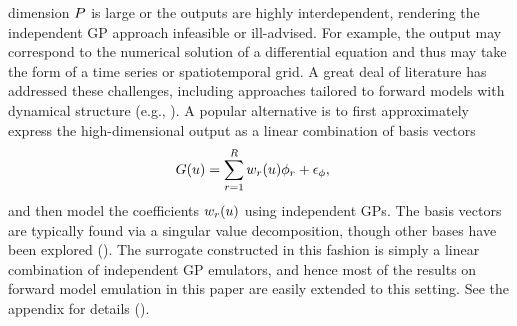 \documentclass[12pt]{article}
\begin{document}
dimension $P$ is large or the outputs are highly interdependent, rendering the independent GP 
approach infeasible or ill-advised. For example, the output may correspond to the numerical solution of 
a differential equation and thus may take the form of a time series or spatiotemporal grid. 
A great deal of literature has addressed these challenges, including approaches tailored to forward models
with dynamical structure 
(e.g., \cite{GP_dynamic_emulation, Bayesian_emulation_dynamic, Liu_West_dynamic_emulation, dynamic_nonlinear_simulators_GP}).
A popular alternative is to first approximately express the high-dimensional output as a linear combination of basis vectors 
\begin{align}
G(u) &= \sum_{r=1}^{R} w_{r}(u) \phi_{r} + \epsilon_{\phi},
\end{align}
and then model the coefficients $w_{r}(u)$ using independent GPs. The basis vectors 
are typically found via a singular value decomposition, though other bases have been explored 
(\cite{HigdonBasis, emulate_functional_output, functionValuedModels, PODemulation}). The surrogate constructed in 
this fashion is simply a linear combination of independent GP emulators, and hence most of the results on forward model 
emulation in this paper are easily extended to this setting. See the appendix for details (\todo). 
\end{document}
